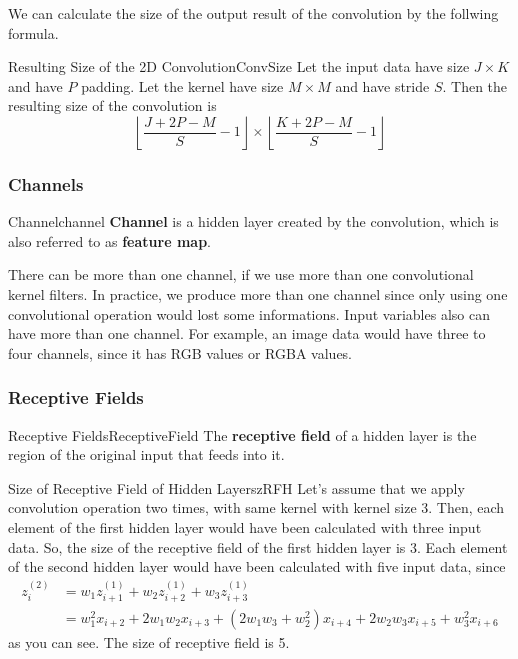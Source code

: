\documentclass{article}
\begin{document}
            We can calculate the size of the output result of the convolution by the follwing formula.
            \begin{thm}{Resulting Size of the 2D Convolution}{ConvSize}
                Let the input data have size $J \times K$ and have $P$ padding. Let the kernel have size $M \times M$ and have stride $S$.
                Then the resulting size of the convolution is
                \[
                \left\lfloor \dfrac{J + 2P - M}{S}-1 \right\rfloor
                \times
                \left\lfloor \dfrac{K + 2P - M}{S}-1 \right\rfloor
                \]
            \end{thm}

        \subsubsection{Channels}
            \begin{defn}{Channel}{channel}
                \textbf{Channel} is a hidden layer created by the convolution, which is also referred to as \textbf{feature map}.
            \end{defn}
            There can be more than one channel, if we use more than one convolutional kernel filters.
            In practice, we produce more than one channel since only using one convolutional operation would lost some informations.
            Input variables also can have more than one channel. For example, an image data would have three to four channels, since it has RGB values or RGBA values.
        
        \subsubsection{Receptive Fields}
            \begin{defn}{Receptive Fields}{ReceptiveField}
                The \textbf{receptive field} of a hidden layer is the region of the original input that feeds into it.
            \end{defn}
            \begin{exm}{Size of Receptive Field of Hidden Layer}{szRFH}
                Let's assume that we apply convolution operation two times, with same kernel with kernel size 3.
                Then, each element of the first hidden layer would have been calculated with three input data.
                So, the size of the receptive field of the first hidden layer is 3.
                Each element of the second hidden layer would have been calculated with five input data, since
                \begin{align*}
                    z_i^{(2)} &= w_1z_{i+1}^{(1)}+w_2z_{i+2}^{(1)}+w_3z_{i+3}^{(1)} \\
                    &=w_1^2x_{i+2}+2w_1w_2x_{i+3}+(2w_1w_3+w_2^2)x_{i+4}+2w_2w_3x_{i+5}+w_3^2x_{i+6}
                \end{align*}
                as you can see. The size of receptive field is 5. 
            \end{exm}
\end{document}
